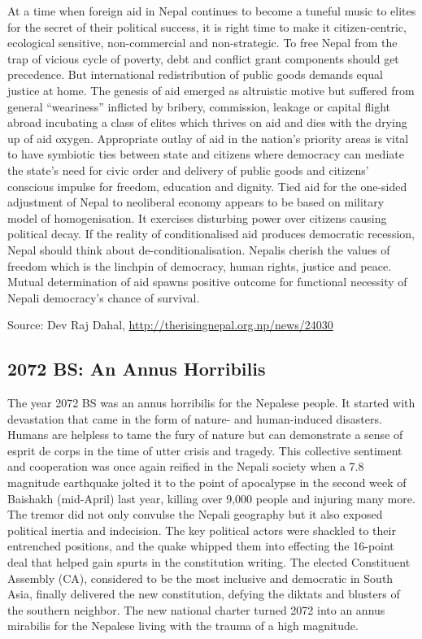 \documentclass[
  openany]{book}
\begin{document}
At a time when foreign aid in Nepal continues to become a tuneful music to elites for the secret of their political success, it is right time to make it citizen-centric, ecological sensitive, non-commercial and non-strategic. To free Nepal from the trap of vicious cycle of poverty, debt and conflict grant components should get precedence. But international redistribution of public goods demands equal justice at home. The genesis of aid emerged as altruistic motive but suffered from general ``weariness'' inflicted by bribery, commission, leakage or capital flight abroad incubating a class of elites which thrives on aid and dies with the drying up of aid oxygen. Appropriate outlay of aid in the nation's priority areas is vital to have symbiotic ties between state and citizens where democracy can mediate the state's need for civic order and delivery of public goods and citizens' conscious impulse for freedom, education and dignity. Tied aid for the one-sided adjustment of Nepal to neoliberal economy appears to be based on military model of homogenisation. It exercises disturbing power over citizens causing political decay. If the reality of conditionalised aid produces democratic recession, Nepal should think about de-conditionalisation. Nepalis cherish the values of freedom which is the linchpin of democracy, human rights, justice and peace. Mutual determination of aid spawns positive outcome for functional necessity of Nepali democracy's chance of survival.

Source: Dev Raj Dahal, \url{http://therisingnepal.org.np/news/24030}

\hypertarget{bs-an-annus-horribilis}{%
\subsection{2072 BS: An Annus Horribilis}\label{bs-an-annus-horribilis}}

The year 2072 BS was an annus horribilis for the Nepalese people. It started with devastation that came in the form of nature- and human-induced disasters. Humans are helpless to tame the fury of nature but can demonstrate a sense of esprit de corps in the time of utter crisis and tragedy. This collective sentiment and cooperation was once again reified in the Nepali society when a 7.8 magnitude earthquake jolted it to the point of apocalypse in the second week of Baishakh (mid-April) last year, killing over 9,000 people and injuring many more. The tremor did not only convulse the Nepali geography but it also exposed political inertia and indecision. The key political actors were shackled to their entrenched positions, and the quake whipped them into effecting the 16-point deal that helped gain spurts in the constitution writing. The elected Constituent Assembly (CA), considered to be the most inclusive and democratic in South Asia, finally delivered the new constitution, defying the diktats and blusters of the southern neighbor. The new national charter turned 2072 into an annus mirabilis for the Nepalese living with the trauma of a high magnitude.
\end{document}
